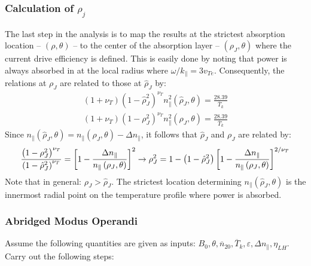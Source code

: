 \subsubsection{Calculation of $\rho_j$}
The last step in the analysis is to map the results at the strictest absorption location -- $(\rho, \theta)$ -- to the center of the absorption layer -- $(\rho_J, \theta)$ where the current drive efficiency is defined. This is easily done by noting that power is always absorbed in at the local radius where $\omega / k _ { \| } = 3 v _ { T e }$. Consequently, the relations at $\rho_J$ are related to those at $\hat \rho_J$ by:
\begin{equation}
	\begin{array} { r } { \left( 1 + \nu _ { T } \right) \left( 1 - \hat { \rho } _ { J } ^ { 2 } \right) ^ { \nu _ { T } } n _ { \| } ^ { 2 } \left( \hat { \rho } _ { J } , \theta \right) = \frac { 28.39 } { \overline { T } _ { k } } } \\ { \left( 1 + \nu _ { T } \right) \left( 1 - \rho _ { J } ^ { 2 } \right) ^ { \nu _ { T } } n _ { \| } ^ { 2 } \left( \rho _ { J } , \theta \right) = \frac { 28.39 } { \overline { T } _ { k } } } \end{array}
\end{equation}
Since $n _ { \| } \left( \hat { \rho } _ { J } , \theta \right) = n _ { \| } \left( \rho _ { J } , \theta \right) - \Delta n _ { \| }$, it follows that $\hat \rho_J$ and $\rho_J$ are related by:
\begin{equation}
	\small
	\frac { \left( 1 - \rho _ { J } ^ { 2 } \right) ^ { \nu _ { T } } } { \left( 1 - \hat { \rho } _ { J } ^ { 2 } \right) ^ { \nu _ { T } } } = \left[ 1 - \frac { \Delta n _ { \| } } { n _ { \| } \left( \rho _ { J } , \theta \right) } \right] ^ { 2 } \rightarrow \rho _ { J } ^ { 2 } = 1 - \left( 1 - \hat { \rho } _ { J } ^ { 2 } \right) \left[ 1 - \frac { \Delta n _ { \| } } { n _ { \| } \left( \rho _ { J } , \theta \right) } \right] ^ { 2 / \nu _ { T } }
\end{equation}
Note that in general: $\rho_J > \hat \rho_J$. The strictest location determining $n_\parallel(\hat \rho_J, \theta)$ is the innermost radial point on the temperature profile where power is absorbed.

\subsubsection{Abridged Modus Operandi}

Assume the following quantities are given as inputs: $B _ { 0 } , \theta , \overline { n } _ { 20 } , \overline { T } _ { k } , \varepsilon , \Delta n _ { \| } , \eta _ { L H }$. Carry out the following steps:

